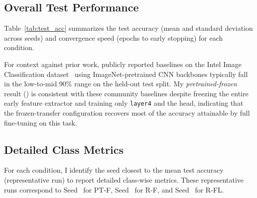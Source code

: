\documentclass[conference]{IEEEtran}
\begin{document}
\subsection{Overall Test Performance}
Table~\ref{tab:test_acc} summarizes the test accuracy (mean and standard deviation across seeds) and convergence speed (epochs to early stopping) for each condition.

For context against prior work, publicly reported baselines on the Intel Image Classification dataset~\cite{intelclassification} using ImageNet-pretrained CNN backbones typically fall in the low-to-mid 90\% range on the held-out test split. My \textit{pretrained-frozen} result (\pretrainedfrozenTestAccMean) is consistent with these community baselines despite freezing the entire early feature extractor and training only \texttt{layer4} and the head, indicating that the frozen-transfer configuration recovers most of the accuracy attainable by full fine-tuning on this task.

\begin{table}[h]
\centering
\caption{Test Accuracy, Convergence Speed, and Training Cost. Epochs reported as mean $\pm$ std across seeds; wall clock is the mean per-run training time to early stopping.}
\label{tab:test_acc}
\setlength{\tabcolsep}{4pt}
\end{table}

\subsection{Detailed Class Metrics}
For each condition, I identify the seed closest to the mean test accuracy (representative run) to report detailed class-wise metrics. These representative runs correspond to Seed \pretrainedfrozenClosestSeed\ for PT-F, Seed \randomfrozenClosestSeed\ for R-F, and Seed \randomfullClosestSeed\ for R-FL.
\end{document}
